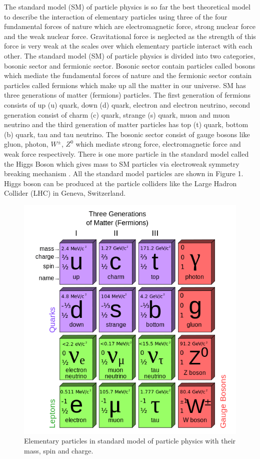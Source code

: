 \documentclass[final,3p]{CSP}
\begin{document}
The standard model (SM) of particle physics is so far the best theoretical model to describe the interaction of elementary 
particles using three of the four fundamental forces of nature which are electromagnetic force, strong nuclear force and the 
weak nuclear force. Gravitational force is neglected as the strength of this force is very weak at the scales over which 
elementary particle interact with each other. The standard model (SM) of particle physics is divided into two categories, 
bosonic sector and fermionic sector. Bosonic sector contain particles called bosons which mediate the fundamental forces of 
nature and the fermionic sector contain particles called fermions which make up all the matter in our universe. SM has three 
generations of matter (fermions) particles. The first generation of fermions consists of up (u) quark, down (d) quark, electron 
and electron neutrino, second generation consist of charm (c) quark, strange (s) quark, muon and muon neutrino and the third 
generation of matter particles has top (t) quark, bottom (b) quark, tau and tau neutrino. The bosonic sector consist of gauge 
bosons like gluon, photon, $W^{\pm}$, $Z^0$ which mediate strong force, electromagnetic force and weak force respectively. There is one more particle in the standard model called the Higgs Boson which gives mass to SM particles via electroweak symmetry breaking mechanism \cite{Chatrchyan:2012xdj}. All the standard model particles are shown in Figure 1. Higgs boson can be produced at the particle colliders like the Large Hadron Collider (LHC) in Geneva, Switzerland.\\

\begin{figure}[H]
	\centering
	\includegraphics[scale=0.4]{./cd11.png}
	\caption{Elementary particles in standard model of particle physics with their mass, spin and charge.}
	\label{figure 1}
\end{figure}
\end{document}
